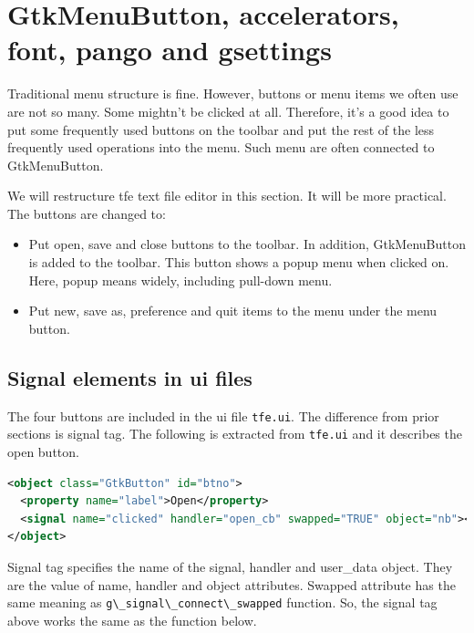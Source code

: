 \hypertarget{gtkmenubutton-accelerators-font-pango-and-gsettings}{%
\section{GtkMenuButton, accelerators, font, pango and
gsettings}\label{gtkmenubutton-accelerators-font-pango-and-gsettings}}

Traditional menu structure is fine. However, buttons or menu items we
often use are not so many. Some mightn't be clicked at all. Therefore,
it's a good idea to put some frequently used buttons on the toolbar and
put the rest of the less frequently used operations into the menu. Such
menu are often connected to GtkMenuButton.

We will restructure tfe text file editor in this section. It will be
more practical. The buttons are changed to:

\begin{itemize}
\tightlist
\item
  Put open, save and close buttons to the toolbar. In addition,
  GtkMenuButton is added to the toolbar. This button shows a popup menu
  when clicked on. Here, popup means widely, including pull-down menu.
\item
  Put new, save as, preference and quit items to the menu under the menu
  button.
\end{itemize}

\hypertarget{signal-elements-in-ui-files}{%
\subsection{Signal elements in ui
files}\label{signal-elements-in-ui-files}}

The four buttons are included in the ui file
\passthrough{\lstinline!tfe.ui!}. The difference from prior sections is
signal tag. The following is extracted from
\passthrough{\lstinline!tfe.ui!} and it describes the open button.

\begin{lstlisting}[language=XML]
<object class="GtkButton" id="btno">
  <property name="label">Open</property>
  <signal name="clicked" handler="open_cb" swapped="TRUE" object="nb"></signal>
</object>
\end{lstlisting}

Signal tag specifies the name of the signal, handler and user\_data
object. They are the value of name, handler and object attributes.
Swapped attribute has the same meaning as
\passthrough{\lstinline!g\_signal\_connect\_swapped!} function. So, the
signal tag above works the same as the function below.

